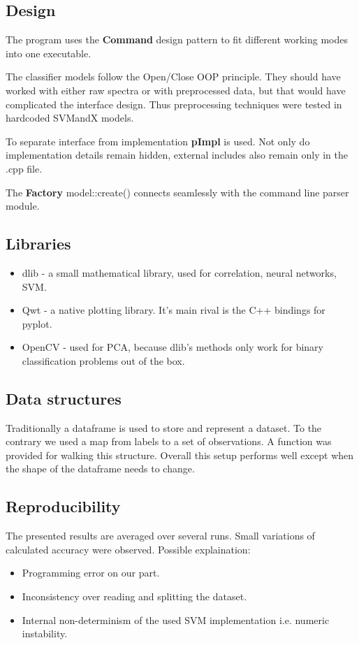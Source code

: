 \documentclass{article}
\begin{document}
\subsection{Design}
The program uses the \textbf{Command} design pattern to fit different working modes into one executable.

The classifier models follow the Open/Close OOP principle.
They should have worked with either raw spectra or with preprocessed data, but that would have complicated the interface design.
Thus preprocessing techniques were tested in hardcoded SVMandX models.

To separate interface from implementation \textbf{pImpl} is used.
Not only do implementation details remain hidden, external includes also remain only in the .cpp file.

The \textbf{Factory} model::create() connects seamlessly with the command line parser module.

\subsection{Libraries}
\begin{itemize}
\item{dlib - a small mathematical library, used for correlation, neural networks, SVM.}
\item{Qwt - a native plotting library. It's main rival is the C++ bindings for pyplot.}
\item{OpenCV - used for PCA, because dlib's methods only work for binary classification problems out of the box.}
\end{itemize}

\subsection{Data structures}
Traditionally a dataframe is used to store and represent a dataset.
To the contrary we used a map from labels to a set of observations.
A function was provided for walking this structure.
Overall this setup performs well except when the shape of the dataframe needs to change.


\subsection{Reproducibility}
The presented results are averaged over several runs.
Small variations of calculated accuracy were observed.
Possible explaination:
\begin{itemize}
\item{Programming error on our part.}
\item{Inconsistency over reading and splitting the dataset.}
\item{Internal non-determinism of the used SVM implementation i.e. numeric instability.}
\end{itemize}
\end{document}
